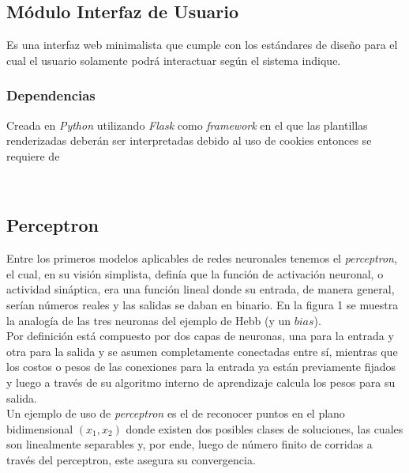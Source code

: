 \documentclass{llncs}
\begin{document}
\subsection{M\'odulo Interfaz de Usuario}

Es una interfaz web minimalista que cumple con los est\'andares de dise\~no para el cual el usuario solamente podr\'a interactuar
seg\'un el sistema indique.

\subsubsection{Dependencias}

Creada en {\textit{Python}} utilizando {\textit{Flask}} como {\textit{framework}} en el que las plantillas renderizadas deber\'an ser
interpretadas debido al uso de cookies entonces se requiere de {\

\subsection{Perceptron}



Entre los primeros modelos aplicables de redes neuronales tenemos el \textit{perceptron}, el cual, en su visi\'on simplista, defin\'ia que
la funci\'on de activaci\'on neuronal, o actividad sin\'aptica, era una funci\'on lineal donde su entrada, de manera general, ser\'ian n\'umeros
reales y las salidas se daban en binario. En la figura 1 se muestra la analog\'ia de las tres neuronas del ejemplo de Hebb (y un $bias$).\\

Por definici\'on est\'a compuesto por dos capas de neuronas, una para la entrada y otra para la salida y se asumen completamente conectadas
entre s\'i, mientras que los costos o pesos de las conexiones para la entrada ya est\'an previamente fijados y luego a trav\'es de su algoritmo
interno de aprendizaje calcula los pesos para su salida. \\


Un ejemplo de uso de \textit{perceptron} es el de reconocer puntos en el plano bidimensional $(x_1, x_2)$ donde existen dos posibles clases de soluciones,
las cuales son linealmente separables y, por ende, luego de n\'umero finito de corridas a trav\'es del perceptron, este asegura su convergencia. \\

}
\end{document}

